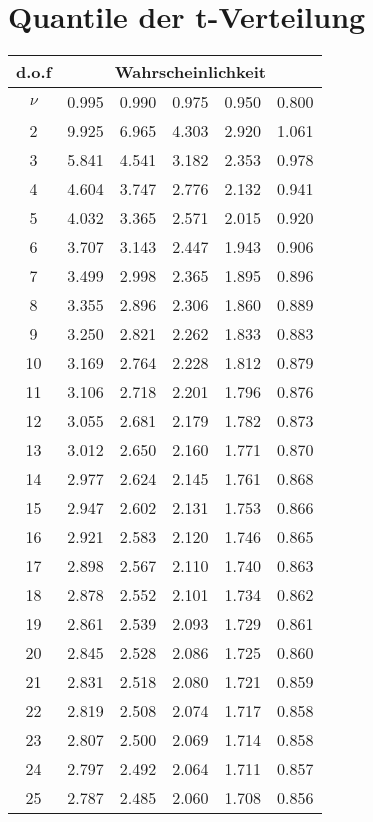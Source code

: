 \section{Quantile der t-Verteilung}

\begin{tabular}{c||c|c|c|c|c|}
d.o.f & \multicolumn{5}{c|}{Wahrscheinlichkeit}\\
\hline
$\nu$ & 0.995 & 0.990 & 0.975 & 0.950 & 0.800 \\
\hline\hline
2 & 9.925 & 6.965 & 4.303 & 2.920 & 1.061 \\
\hline
3 & 5.841 & 4.541 & 3.182 & 2.353 & 0.978 \\
\hline
4 & 4.604 & 3.747 & 2.776 & 2.132 & 0.941 \\
\hline
5 & 4.032 & 3.365 & 2.571 & 2.015 & 0.920 \\
\hline
6 & 3.707 & 3.143 & 2.447 & 1.943 & 0.906 \\
\hline
7 & 3.499 & 2.998 & 2.365 & 1.895 & 0.896 \\
\hline
8 & 3.355 & 2.896 & 2.306 & 1.860 & 0.889 \\
\hline
9 & 3.250 & 2.821 & 2.262 & 1.833 & 0.883 \\
\hline
10 & 3.169 & 2.764 & 2.228 & 1.812 & 0.879 \\
\hline
11 & 3.106 & 2.718 & 2.201 & 1.796 & 0.876 \\
\hline
12 & 3.055 & 2.681 & 2.179 & 1.782 & 0.873 \\
\hline
13 & 3.012 & 2.650 & 2.160 & 1.771 & 0.870 \\
\hline
14 & 2.977 & 2.624 & 2.145 & 1.761 & 0.868 \\
\hline
15 & 2.947 & 2.602 & 2.131 & 1.753 & 0.866 \\
\hline
16 & 2.921 & 2.583 & 2.120 & 1.746 & 0.865 \\
\hline
17 & 2.898 & 2.567 & 2.110 & 1.740 & 0.863 \\
\hline
18 & 2.878 & 2.552 & 2.101 & 1.734 & 0.862 \\
\hline
19 & 2.861 & 2.539 & 2.093 & 1.729 & 0.861 \\
\hline
20 & 2.845 & 2.528 & 2.086 & 1.725 & 0.860 \\
\hline
21 & 2.831 & 2.518 & 2.080 & 1.721 & 0.859 \\
\hline
22 & 2.819 & 2.508 & 2.074 & 1.717 & 0.858 \\
\hline
23 & 2.807 & 2.500 & 2.069 & 1.714 & 0.858 \\
\hline
24 & 2.797 & 2.492 & 2.064 & 1.711 & 0.857 \\
\hline
25 & 2.787 & 2.485 & 2.060 & 1.708 & 0.856 \\
\hline
\end{tabular}
